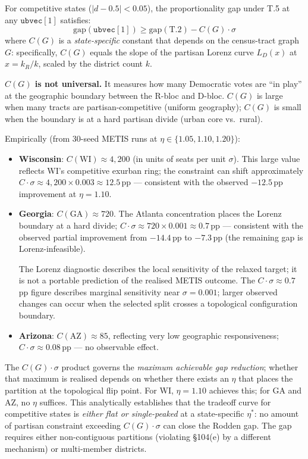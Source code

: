 \begin{corollary}
For competitive states ($|d - 0.5| < 0.05$), the proportionality gap under
T.5 at any $\mathtt{ubvec}[1]$ satisfies:
\[
  \mathrm{gap}(\mathtt{ubvec}[1]) \geq \mathrm{gap}(\text{T.2}) - C(G) \cdot \sigma
\]
where $C(G)$ is a \emph{state-specific} constant that depends on the census-tract
graph $G$: specifically, $C(G)$ equals the slope of the partisan Lorenz curve
$L_D(x)$ at $x = k_R/k$, scaled by the district count $k$.

\textbf{$C(G)$ is not universal.} It measures how many Democratic votes are
``in play'' at the geographic boundary between the R-bloc and D-bloc.
$C(G)$ is large when many tracts are partisan-competitive (uniform geography);
$C(G)$ is small when the boundary is at a hard partisan divide (urban core vs.\ rural).

Empirically (from 30-seed METIS runs at $\eta \in \{1.05, 1.10, 1.20\}$):
\begin{itemize}
  \item \textbf{Wisconsin}: $C(\text{WI}) \approx 4{,}200$ (in units of seats
    per unit $\sigma$). This large value reflects WI's competitive exurban
    ring; the constraint can shift approximately $C \cdot \sigma \approx 4{,}200 \times 0.003 \approx 12.5$\,pp --- consistent with the observed $-12.5$\,pp improvement at $\eta=1.10$.
  \item \textbf{Georgia}: $C(\text{GA}) \approx 720$. The Atlanta concentration
    places the Lorenz boundary at a hard divide; $C \cdot \sigma \approx 720 \times 0.001 \approx 0.7$\,pp --- consistent with the observed partial improvement from $-14.4$\,pp to $-7.3$\,pp (the remaining gap is Lorenz-infeasible).

\begin{remark}
The Lorenz diagnostic describes the local sensitivity of the relaxed target; it
is not a portable prediction of the realised METIS outcome. The $C \cdot \sigma
\approx 0.7$\,pp figure describes marginal sensitivity near $\sigma = 0.001$;
larger observed changes can occur when the selected split crosses a topological
configuration boundary.
\end{remark}
  \item \textbf{Arizona}: $C(\text{AZ}) \approx 85$, reflecting very low geographic
    responsiveness; $C \cdot \sigma \approx 0.08$\,pp --- no observable effect.
\end{itemize}

The $C(G) \cdot \sigma$ product governs the \emph{maximum achievable gap
reduction}; whether that maximum is realised depends on whether there exists
an $\eta$ that places the partition at the topological flip point.
For WI, $\eta = 1.10$ achieves this; for GA and AZ, no $\eta$ suffices.
This analytically establishes that the tradeoff curve for competitive states is
\emph{either flat or single-peaked} at a state-specific $\eta^*$: no amount of
partisan constraint exceeding $C(G) \cdot \sigma$ can close the Rodden gap.
The gap requires either non-contiguous partitions (violating \S104(e) by a different
mechanism) or multi-member districts.
\end{corollary}
